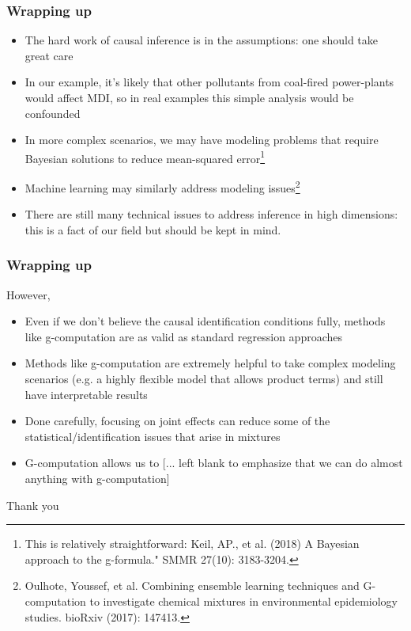 \begin{frame}[t, fragile]
  \frametitle{Wrapping up}
    \begin{itemize}
      \item The hard work of causal inference is in the assumptions: one should take great care
      \item In our example, it's likely that other pollutants from coal-fired power-plants would affect MDI, so in real examples this simple analysis would be confounded
      \item In more complex scenarios, we may have modeling problems that require Bayesian solutions to reduce mean-squared error\footnote{This is relatively straightforward: Keil, AP., et al. (2018) A Bayesian approach to the g-formula." SMMR 27(10): 3183-3204.}
      \item Machine learning may similarly address modeling issues\footnote{Oulhote, Youssef, et al. Combining ensemble learning techniques and G-computation to investigate chemical mixtures in environmental epidemiology studies. bioRxiv (2017): 147413.}
      \item There are still many technical issues to address inference in high dimensions: this is a fact of our field but should be kept in mind.
    \end{itemize}

 \end{frame}

\begin{frame}[t, fragile]
  \frametitle{Wrapping up}
  However,
    \begin{itemize}
      \item Even if we don't believe the causal identification conditions fully, methods like g-computation are as valid as standard regression approaches
      \item Methods like g-computation are extremely helpful to take complex modeling scenarios (e.g. a highly flexible model that allows product terms) and still have interpretable results
      \item Done carefully, focusing on joint effects can reduce some of the statistical/identification issues that arise in mixtures
      \item G-computation allows us to [... left blank to emphasize that we can do almost anything with g-computation]
    \end{itemize}

 \end{frame}


\begin{frame}[c, fragile]
\centering
Thank you
 \end{frame}


